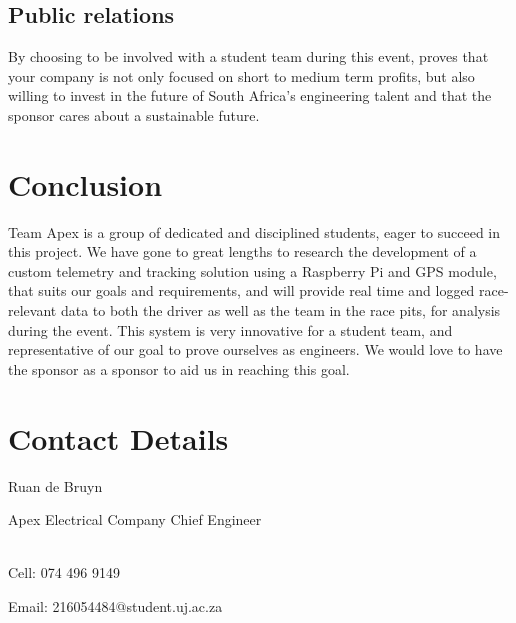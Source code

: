 \documentclass[a4paper, 12pt]{article}
\newcommand{\company}{the sponsor}
\begin{document}
		\subsection{Public relations} %
		\label{sub:public_relations}
			By choosing to be involved with a student team during this event, proves that your company is not only focused on short to medium term profits, but also willing to invest in the future of South Africa's engineering talent and that \company{} cares about a sustainable future.
	
	\section{Conclusion} %
	\label{sec:conclusion}
		Team Apex is a group of dedicated and disciplined students, eager to succeed in this project. We have gone to great lengths to research the development of a custom telemetry and tracking solution using a Raspberry Pi and GPS module, that suits our goals and requirements, and will provide real time and logged race-relevant data to both the driver as well as the team in the race pits, for analysis during the event. This system is very innovative for a student team, and representative of our goal to prove ourselves as engineers. We would love to have \company{} as a sponsor to aid us in reaching this goal.

	\newpage
	\section{Contact Details} %
	\label{sec:contact_details} 
		Ruan de Bruyn\par\noindent
		Apex Electrical Company Chief Engineer\par\par\noindent\\
		Cell: 074 496 9149\par\noindent
		Email: 216054484@student.uj.ac.za


\end{document}
